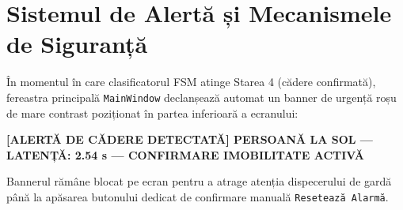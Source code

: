 \section{Sistemul de Alertă și Mecanismele de Siguranță}
În momentul în care clasificatorul FSM atinge Starea 4 (cădere confirmată), fereastra principală \texttt{MainWindow} declanșează automat un banner de urgență roșu de mare contrast poziționat în partea inferioară a ecranului:
\begin{center}
\textbf{[ALERTĂ DE CĂDERE DETECTATĂ] PERSOANĂ LA SOL — LATENȚĂ: 2.54 s — CONFIRMARE IMOBILITATE ACTIVĂ}
\end{center}
Bannerul rămâne blocat pe ecran pentru a atrage atenția dispecerului de gardă până la apăsarea butonului dedicat de confirmare manuală \texttt{Resetează Alarmă}.
